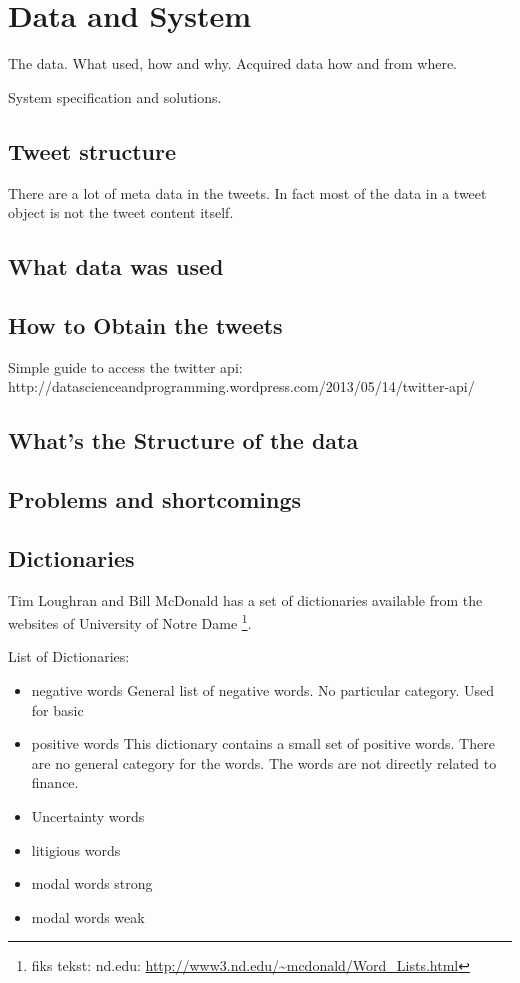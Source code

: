 \chapter{Data and System}
The data. What used, how and why. Acquired data how and from where. 

System specification and solutions. 

\section{Tweet structure}
There are a lot of meta data in the tweets. In fact most of the data in a tweet
object is not the tweet content itself. 

\section{What data was used}
\section{How to Obtain the tweets}
Simple guide to access the twitter api:  http://datascienceandprogramming.wordpress.com/2013/05/14/twitter-api/

\section{What's the Structure of the data}
\section{Problems and shortcomings}

\section{Dictionaries}\label{sec:dict}

Tim Loughran and Bill McDonald has a set of dictionaries available from the
websites of University of Notre Dame \footnote{fiks tekst: nd.edu:
\url{http://www3.nd.edu/~mcdonald/Word_Lists.html}}. 

List of Dictionaries:
\begin{itemize}
    \item negative words
General list of negative words. No particular category. Used for basic   
    \item positive words
This dictionary contains a small set of positive words. There are no general
category for the words. The words are not directly related to finance. 
    \item Uncertainty words
    \item litigious words
    \item modal words strong
    \item modal words weak
\end{itemize}

